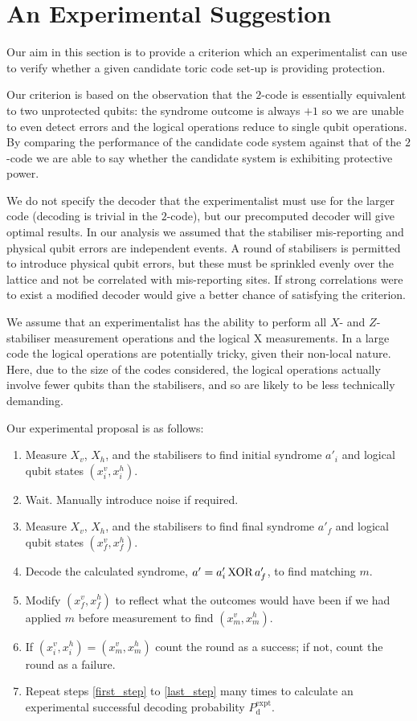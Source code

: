 \section{An Experimental Suggestion}

Our aim in this section is to provide a criterion which an experimentalist can use to verify whether a given candidate toric code set-up is providing protection.

Our criterion is based on the observation that the $2$-code is essentially equivalent to two unprotected qubits: the syndrome outcome is always $+1$ so we are unable to even detect errors and the logical operations reduce to single qubit operations. By comparing the performance of the candidate code system against that of the $2$-code we are able to say whether the candidate system is exhibiting protective power. 

We do not specify the decoder that the experimentalist must use for the larger code (decoding is trivial in the $2$-code), but our precomputed decoder will give optimal results. In our analysis we assumed that the stabiliser mis-reporting and physical qubit errors are independent events. A round of stabilisers is permitted to introduce physical qubit errors, but these must be sprinkled evenly over the lattice and not be correlated with mis-reporting sites. If strong correlations were to exist a modified decoder would give a better chance of satisfying the criterion.

We assume that an experimentalist has the ability to perform all $X$- and $Z$-stabiliser measurement operations and the logical X measurements. In a large code the logical operations are potentially tricky, given their non-local nature. Here, due to the size of the codes considered, the logical operations actually involve fewer qubits than the stabilisers, and so are likely to be less technically demanding.

Our experimental proposal is as follows:
\begin{enumerate}
  \item Measure  $X_v$, $X_h$, and the stabilisers to find initial syndrome $a'_i$ and logical qubit states $(x^v_i, x^h_i).$\label{first_step}
  \item Wait. Manually introduce noise if required.
  \item Measure $X_v$, $X_h$, and the stabilisers to find final syndrome $a'_f$ and logical qubit states $(x^v_f, x^h_f)$.
  \item Decode the calculated syndrome, $a' = a'_i \text{\,XOR\,} a'_f$, to find matching $m$. \label{decode_step}
  \item Modify $(x^v_f, x^h_f)$ to reflect what the outcomes would have been if we had applied $m$ before measurement to find $(x^v_m, x^h_m)$.
  \item If $(x^v_i, x^h_i) = (x^v_m, x^h_m)$ count the round as a success; if not, count the round as a failure.\label{last_step}
  \item Repeat steps \ref{first_step} to \ref{last_step} many times to calculate an experimental successful decoding probability $P_\text{d}^\text{expt}$.
\end{enumerate}

